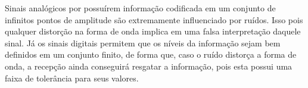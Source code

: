 Sinais analógicos por possuírem informação codificada em um conjunto de infinitos pontos de amplitude são extremamente influenciado por ruídos. Isso pois qualquer distorção na forma de onda implica em uma falsa interpretação daquele sinal. Já os sinais digitais permitem que os níveis da informação sejam bem definidos em um conjunto finito, de forma que, caso o ruído distorça a forma de onda, a recepção ainda conseguirá resgatar a informação, pois esta possui uma faixa de tolerância para seus valores.
